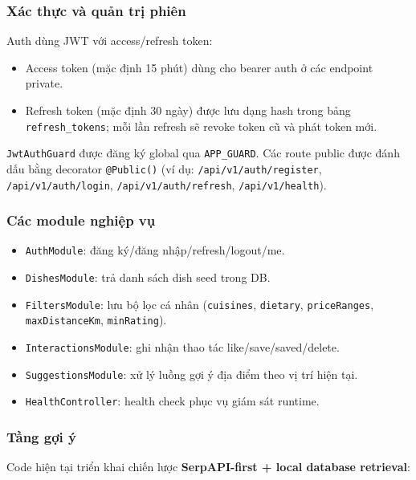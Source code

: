\subsubsection{Xác thực và quản trị phiên}

Auth dùng JWT với access/refresh token:
\begin{itemize}
  \item Access token (mặc định 15 phút) dùng cho bearer auth ở các endpoint private.
  \item Refresh token (mặc định 30 ngày) được lưu dạng hash trong bảng \texttt{refresh\_tokens}; mỗi lần refresh sẽ revoke token cũ và phát token mới.
\end{itemize}

\texttt{JwtAuthGuard} được đăng ký global qua \texttt{APP\_GUARD}. Các route public được đánh dấu bằng decorator \texttt{@Public()} (ví dụ: \texttt{/api/v1/auth/register}, \texttt{/api/v1/auth/login}, \texttt{/api/v1/auth/refresh}, \texttt{/api/v1/health}).

\subsubsection{Các module nghiệp vụ}

\begin{itemize}
  \item \texttt{AuthModule}: đăng ký/đăng nhập/refresh/logout/me.
  \item \texttt{DishesModule}: trả danh sách dish seed trong DB.
  \item \texttt{FiltersModule}: lưu bộ lọc cá nhân (\texttt{cuisines}, \texttt{dietary}, \texttt{priceRanges}, \texttt{maxDistanceKm}, \texttt{minRating}).
  \item \texttt{InteractionsModule}: ghi nhận thao tác like/save/saved/delete.
  \item \texttt{SuggestionsModule}: xử lý luồng gợi ý địa điểm theo vị trí hiện tại.
  \item \texttt{HealthController}: health check phục vụ giám sát runtime.
\end{itemize}

\subsubsection{Tầng gợi ý}

Code hiện tại triển khai chiến lược \textbf{SerpAPI-first + local database retrieval}:

